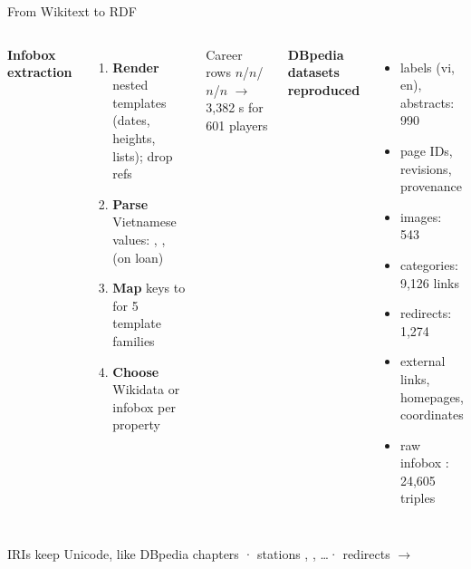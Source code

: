 
\begin{frame}{From Wikitext to RDF}
    \begin{columns}[T]
    \textbf{Infobox extraction}
    \begin{enumerate}
        \footnotesize
        \item \textbf{Render} nested templates (dates, heights, lists); drop refs
        \item \textbf{Parse} Vietnamese values: , ,
               (on loan)
        \item \textbf{Map} keys to  for 5 template families
        \item \textbf{Choose} Wikidata or infobox per property
    \end{enumerate}
    \vspace{0.3em}
    \footnotesize
    Career rows $n$/$n$/$n$/$n$
    $\rightarrow$ \alert{3{,}382} s for 601 players

    \textbf{DBpedia datasets reproduced}
    \begin{itemize}
        \footnotesize
        \item labels (vi, en), abstracts: 990
        \item page IDs, revisions, provenance
        \item images: 543
        \item categories: 9{,}126 links
        \item redirects: 1{,}274
        \item external links, homepages, coordinates
        \item raw infobox : 24{,}605 triples
    \end{itemize}
    \end{columns}
    \vspace{0.8em}
    \begin{block}{IRIs keep Unicode, like DBpedia chapters}
        \footnotesize
         \;·\; stations
        , , \ldots \;·\; redirects $\rightarrow$
    \end{block}
\end{frame}

